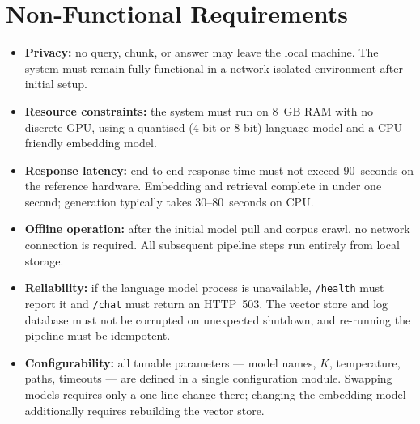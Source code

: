 \section{Non-Functional Requirements}
\label{sec:req-nonfunctional}

\begin{itemize}
    \item \textbf{Privacy:} no query, chunk, or answer may leave the local machine. The system must remain fully functional in a network-isolated environment after initial setup.

    \item \textbf{Resource constraints:} the system must run on 8~GB RAM with no discrete GPU, using a quantised (4-bit or 8-bit) language model and a CPU-friendly embedding model.

    \item \textbf{Response latency:} end-to-end response time must not exceed 90~seconds on the reference hardware. Embedding and retrieval complete in under one second; generation typically takes 30--80~seconds on CPU.

    \item \textbf{Offline operation:} after the initial model pull and corpus crawl, no network connection is required. All subsequent pipeline steps run entirely from local storage.

    \item \textbf{Reliability:} if the language model process is unavailable, \texttt{/health} must report it and \texttt{/chat} must return an HTTP~503. The vector store and log database must not be corrupted on unexpected shutdown, and re-running the pipeline must be idempotent.

    \item \textbf{Configurability:} all tunable parameters — model names, $K$, temperature, paths, timeouts — are defined in a single configuration module. Swapping models requires only a one-line change there; changing the embedding model additionally requires rebuilding the vector store.
\end{itemize}
